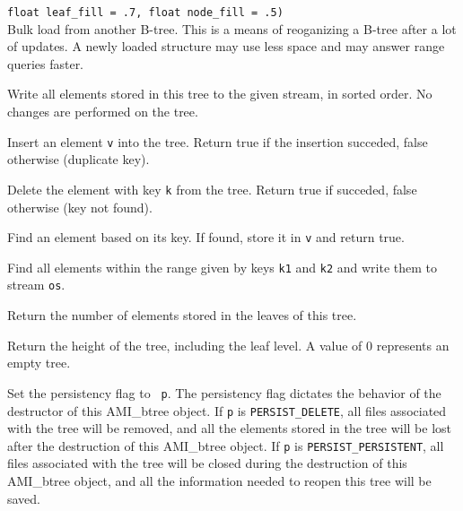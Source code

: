    {{\tt\qquad\qquad\qquad\qquad float leaf\_fill = .7, float node\_fill =
   .5)} \\ Bulk load from another B-tree. This is a means of reoganizing a
   B-tree after a lot of updates. A newly loaded structure may use less
   space and may answer range queries faster.}

    {Write all elements stored in
   this tree to the given stream, in sorted order. No changes are performed
   on the tree.}

    {Insert an element {\tt v} into the
   tree. Return true if the insertion succeded, false otherwise (duplicate
   key).}

    {Delete the element with key {\tt k}
   from the tree. Return true if succeded, false otherwise (key not
   found).}

    {Find an element based on
   its key. If found, store it in {\tt v} and return true.}

    {Find all elements within the range given by
   keys {\tt k1} and {\tt k2} and write them to stream {\tt os}.}


    {Return the number of elements
   stored in the leaves of this tree.}

    {Return the height of the tree, including
   the leaf level. A value of $0$ represents an empty tree.}

    {Set the persistency flag to {\tt
   p}. The persistency flag dictates the behavior of the destructor of
   this AMI\_btree object. If {\tt p} is {\tt PERSIST\_DELETE}, all files
   associated with the tree will be removed, and all the elements stored in
   the tree will be lost after the destruction of this AMI\_btree object. If
   {\tt p} is {\tt PERSIST\_PERSISTENT}, all files associated with the tree
   will be closed during the destruction of this AMI\_btree object, and all the
   information needed to reopen this tree will be saved.}

